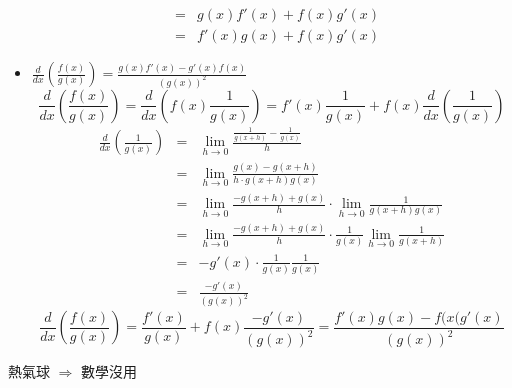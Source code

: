 \begin{itemize}
$$\begin{array}{rcl}
& = & \displaystyle g(x)f'(x) + f(x)g'(x)\\
& = & \displaystyle f'(x)g(x) + f(x)g'(x)
\end{array}$$
\item $\displaystyle \frac{d}{dx} (\frac{f(x)}{g(x)}) = \frac{g(x)f'(x) - g'(x)f(x)}{(g(x))^2}$ \quad {}
$$\displaystyle \frac{d}{dx} (\frac{f(x)}{g(x)}) = \frac{d}{dx}(f(x) \frac{1}{g(x)}) = f'(x) \frac{1}{g(x)} + f(x) \frac{d}{dx} (\frac{1}{g(x)})$$
$$\begin{array}{rcl}
\displaystyle \frac{d}{dx} (\frac{1}{g(x)}) & = & \displaystyle \lim_{h \to 0} \frac{\frac{1}{g(x+h)} - \frac{1}{g(x)}}{h}\\
& = & \displaystyle \lim_{h \to 0} \frac{g(x) -g(x+h)}{h \cdot g(x+h)g(x)}\\
& = & \displaystyle \lim_{h \to 0} \frac{-g(x+h) + g(x)}{h} \cdot \lim_{h \to 0} \frac{1}{g(x+h) g(x)}\\
& = & \displaystyle \lim_{h \to 0} \frac{-g(x+h) + g(x)}{h} \cdot \frac{1}{g(x)}\lim_{h \to 0} \frac{1}{g(x+h)}\\
& = & \displaystyle -g'(x) \cdot \frac{1}{g(x)}\frac{1}{g(x)}\\
& = & \displaystyle \frac{-g'(x)}{(g(x))^2}
\end{array}$$
$$\displaystyle \frac{d}{dx} (\frac{f(x)}{g(x)}) = \frac{f'(x)}{g(x)} + f(x) \frac{-g'(x)}{(g(x))^2} = \frac{f'(x)g(x) - f(x(g'(x)}{(g(x))^2}$$
\end{itemize}

\begin{jk}{}
熱氣球 $\Rightarrow$ 數學沒用
\end{jk}

